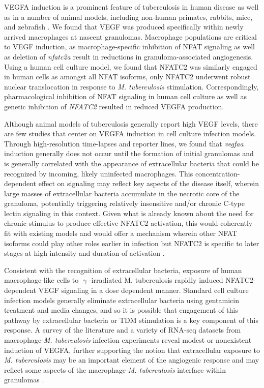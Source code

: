 VEGFA induction is a prominent feature of tuberculosis in human disease as well as in a number of animal models, including non\hyp{}human primates, rabbits, mice, and zebrafish \citep{Datta2015, Oehlers2015, Polena2016, Harding2019, Cronan2021, Gideon2022}. We found that VEGF was produced specifically within newly arrived macrophages at nascent granulomas. Macrophage populations are critical to VEGF induction, as macrophage\hyp{}specific inhibition of NFAT signaling as well as deletion of \textit{nfatc2a} result in reductions in granuloma\hyp{}associated angiogenesis. Using a human cell culture model, we found that NFATC2 was similarly engaged in human cells as amongst all NFAT isoforms, only NFATC2 underwent robust nuclear translocation in response to \textit{M. tuberculosis} stimulation. Correspondingly, pharmacological inhibition of NFAT signaling in human cell culture as well as genetic inhibition of \textit{NFATC2} resulted in reduced VEGFA production.

Although animal models of tuberculosis generally report high VEGF levels, there are few studies that center on VEGFA induction in cell culture infection models. Through high\hyp{}resolution time\hyp{}lapses and reporter lines, we found that \textit{vegfaa} induction generally does not occur until the formation of initial granulomas and is generally correlated with the appearance of extracellular bacteria that could be recognized by incoming, likely uninfected macrophages. This concentration\hyp{}dependent effect on signaling may reflect key aspects of the disease itself, wherein large masses of extracellular bacteria accumulate in the necrotic core of the granuloma, potentially triggering relatively insensitive and/or chronic C\hyp{}type lectin signaling in this context. Given what is already known about the need for chronic stimulus to produce effective NFATC2 activation, this would coherently fit with existing models and would offer a mechanism wherein other NFAT isoforms could play other roles earlier in infection but NFATC2 is specific to later stages at high intensity and duration of activation \citep{Yissachar2013, Kar2015}. 

Consistent with the recognition of extracellular bacteria, exposure of human macrophage\hyp{}like cells to $\upgamma$\hyp{}irradiated M. tuberculosis rapidly induced NFATC2\hyp{}dependent VEGF signaling in a dose dependent manner. Standard cell culture infection models generally eliminate extracellular bacteria using gentamicin treatment and media changes, and so it is possible that engagement of this pathway by extracellular bacteria or TDM stimulation is a key component of this response. A survey of the literature and a variety \citep{Lee2019, Pisu2020, Hall2021, Looney2021, Pu2021} of RNA\hyp{}seq datasets from macrophage\hyp{}\textit{M. tuberculosis} infection experiments reveal modest or nonexistent induction of VEGFA, further supporting the notion that extracellular exposure to \textit{M. tuberculosis} may be an important element of the angiogenic response and may reflect some aspects of the macrophage\hyp{}\textit{M. tuberculosis} interface within granulomas \citep{Orme2014b}.

